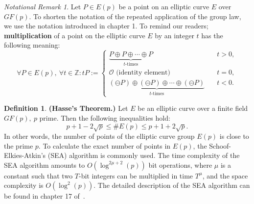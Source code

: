 \documentclass[thesis=M,english]{FITthesis}[2012/10/20]
\theoremstyle{remark}
\newtheorem*{NRM}{Notational Remark}
\theoremstyle{definition}
\newtheorem{DF}{Definition}[section]
\begin{document}
\begin{NRM}
Let $P \in E(p)$ be a point on an elliptic curve $E$ over $GF(p)$. To shorten the notation of the repeated application of the group law, we use the notation introduced in chapter 1. To remind our readers; \textbf{multiplication} of a point on the elliptic curve $E$ by an integer $t$ has the following meaning:
$$
\forall P \in E(p),\ \forall t \in \mathbb{Z}: tP := \begin{cases} \underbrace{P \oplus P \oplus \cdots \oplus P}_{\text{$t$-times}} &\quad t > 0, \\
\mathcal{O} \text{ (identity element) } &\quad t = 0, \\
\underbrace{(\ominus P) \oplus (\ominus P) \oplus \cdots \oplus (\ominus P)}_{\text{$t$-times}} &\quad t < 0.
\end{cases}
$$
\end{NRM}
\begin{DF}\textbf{(Hasse's Theorem.)} \label{hase}Let $E$ be an elliptic curve over a finite field $GF(p),\ p$ prime. Then the following inequalities hold:
$$
p + 1 -2\sqrt{p} \leq \#E(p) \leq p + 1 + 2\sqrt{p}.
$$
In other words, the number of points of the elliptic curve group $E(p)$ is close to the prime $p$. To calculate the exact number of points in $E(p)$, the Schoof-Elkies-Atkin's (SEA) algorithm is commonly used. The time complexity of the SEA algorithm amounts to $O(\log^{2\mu + 2}(p))$ bit operations, where $\mu$ is a constant such that two $T$-bit integers can be multiplied in time $T^\mu$, and the space complexity is $O(\log^2(p)).$ The detailed description of the SEA algorithm can be found in chapter 17 of~\cite{handbook}. 
\end{DF}
\end{document}
